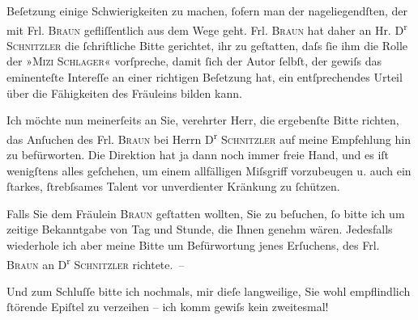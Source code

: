                Beſetzung einige Schwierigkeiten {\pb}zu machen,{ }ſofern man der nageliegendſten, der mit Frl. \textsc{Braun} gefliſſentlich aus dem Wege geht. Frl. \textsc{Braun} hat daher an Hr. D\textsuperscript{r}{ }\textsc{Schnitzler} die{ }ſchriftliche Bitte gerichtet, ihr zu
               geſtatten, daſs{ }ſie ihm die Rolle der »\textsc{Mizi Schlager}« vorſpreche, damit{ }ſich der Autor{ }ſelbſt, der gewiſs das eminenteſte Intereſſe
               an einer richtigen Beſetzung hat, ein entſprechendes Urteil über die Fähigkeiten des
               Fräuleins bilden kann.\pend
           
\pstart
           Ich möchte nun meinerſeits an Sie, verehrter Herr, die ergebenſte Bitte richten, das
                  {\pb}Anſuchen des Frl. \textsc{Braun} bei Herrn D\textsuperscript{r}{ }\textsc{Schnitzler} auf meine Empfehlung hin zu befürworten. Die
               Direktion hat ja dann noch immer freie Hand, und es iſt wenigſtens alles geſchehen,
               um einem allfälligen Miſsgriff vorzubeugen u. auch ein{ }ſtarkes,{ }ſtrebſsames Talent
               vor unverdienter Kränkung zu{ }ſchützen.\pend
           
\pstart
           Falls Sie dem Fräulein \textsc{Braun} geſtatten wollten, Sie zu beſuchen,{ }ſo bitte ich um zeitige Bekanntgabe von Tag
               und Stunde, die Ihnen {\pb}genehm
               wären. Jedesfalls wiederhole ich aber meine Bitte um Befürwortung jenes Erſuchens,
               des Frl. \textsc{Braun} an D\textsuperscript{r}{ }\textsc{Schnitzler}
               richtete. –\pend
           
\pstart
           Und zum Schluſſe bitte ich nochmals, mir dieſe langweilige, Sie wohl empflindlich{ }ſtörende Epiſtel zu verzeihen – ich komm gewiſs kein zweitesmal!\pend
           
